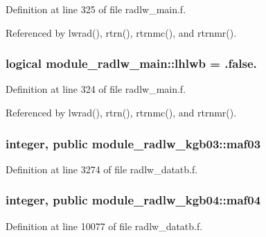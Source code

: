 Definition at line 325 of file radlw\+\_\+main.\+f.



Referenced by lwrad(), rtrn(), rtrnmc(), and rtrnmr().

\subsubsection[{\texorpdfstring{lhlwb}{lhlwb}}]{\setlength{\rightskip}{0pt plus 5cm}logical module\+\_\+radlw\+\_\+main\+::lhlwb = .false.\hspace{0.3cm}{\ttfamily [private]}}\hypertarget{group__module__radlw__main_ga40b8a6f612a53e0a768cf922aa6f73c3}{}\label{group__module__radlw__main_ga40b8a6f612a53e0a768cf922aa6f73c3}


Definition at line 324 of file radlw\+\_\+main.\+f.



Referenced by lwrad(), rtrn(), rtrnmc(), and rtrnmr().

\subsubsection[{\texorpdfstring{maf03}{maf03}}]{\setlength{\rightskip}{0pt plus 5cm}integer, public module\+\_\+radlw\+\_\+kgb03\+::maf03}\hypertarget{group__module__radlw__main_ga90d1081db011f0682cb4a83c40c5bb23}{}\label{group__module__radlw__main_ga90d1081db011f0682cb4a83c40c5bb23}


Definition at line 3274 of file radlw\+\_\+datatb.\+f.

\subsubsection[{\texorpdfstring{maf04}{maf04}}]{\setlength{\rightskip}{0pt plus 5cm}integer, public module\+\_\+radlw\+\_\+kgb04\+::maf04}\hypertarget{group__module__radlw__main_ga60ff35def4e526c7d9cf3ec88bdd4485}{}\label{group__module__radlw__main_ga60ff35def4e526c7d9cf3ec88bdd4485}


Definition at line 10077 of file radlw\+\_\+datatb.\+f.

